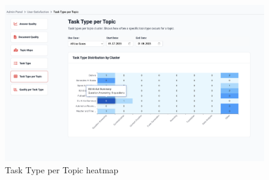 \documentclass[
	english,
	ruledheaders=section,%
	class=report,%
	thesis={type=bachelor},%
	accentcolor=1b,%
	custommargins=true,%
	marginpar=false,%
	parskip=half-,%
	fontsize=11pt,%
	DIV=14,
]{tudapub}
\begin{document}
\begin{figure}[h!]
    \centering
    \includegraphics[width=0.75\linewidth]{images/TaskTypePerTopic.png}
    \captionsetup{list=no}
    \caption{Task Type per Topic heatmap}
    \label{fig:task_type_per_topic}
\end{figure}

\clearpage %
\end{document}
